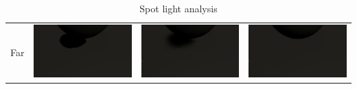 \begin{table}
\begin{tabular}{| c | c | c | c | }
\begin{minipage}{.3\textwidth}
            \end{minipage}
    \\ \hline
    Far &   \begin{minipage}{.3\textwidth}
            \includegraphics[width=\linewidth]{figures/shadows/spot-far-cleaned}
            \end{minipage}
        &
            \begin{minipage}{.3\textwidth}
            \includegraphics[width=\linewidth]{figures/shadows/spot-wide-far-cleaned}
            \end{minipage}
            & 
            \begin{minipage}{.3\textwidth}
            \includegraphics[width=\linewidth]{figures/shadows/spot-widest-far-cleaned}
            \end{minipage}
    \\ \hline
  \end{tabular}
  \caption{Spot light analysis}\label{tbl:spot-analysis}
\end{table}
